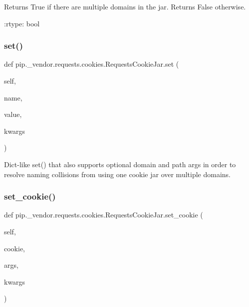 \begin{DoxyVerb}Returns True if there are multiple domains in the jar.
Returns False otherwise.

:rtype: bool
\end{DoxyVerb}
 \mbox{\label{classpip_1_1__vendor_1_1requests_1_1cookies_1_1RequestsCookieJar_a260fad74070bef0c7425638900100707}} 
\subsubsection{\texorpdfstring{set()}{set()}}
{\footnotesize\ttfamily def pip.\+\_\+vendor.\+requests.\+cookies.\+Requests\+Cookie\+Jar.\+set (\begin{DoxyParamCaption}\item[{}]{self,  }\item[{}]{name,  }\item[{}]{value,  }\item[{}]{kwargs }\end{DoxyParamCaption})}

\begin{DoxyVerb}Dict-like set() that also supports optional domain and path args in
order to resolve naming collisions from using one cookie jar over
multiple domains.
\end{DoxyVerb}
 \mbox{\label{classpip_1_1__vendor_1_1requests_1_1cookies_1_1RequestsCookieJar_ab4c48d452c9788d13587e437966d17af}} 
\subsubsection{\texorpdfstring{set\+\_\+cookie()}{set\_cookie()}}
{\footnotesize\ttfamily def pip.\+\_\+vendor.\+requests.\+cookies.\+Requests\+Cookie\+Jar.\+set\+\_\+cookie (\begin{DoxyParamCaption}\item[{}]{self,  }\item[{}]{cookie,  }\item[{}]{args,  }\item[{}]{kwargs }\end{DoxyParamCaption})}

